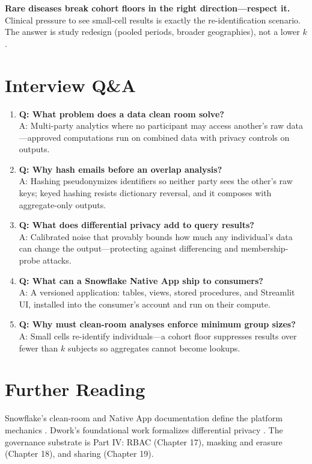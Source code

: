 \begin{pitfall}
\textbf{Rare diseases break cohort floors in the right direction---respect it.} Clinical pressure to see small-cell results is exactly the re-identification scenario. The answer is study redesign (pooled periods, broader geographies), not a lower $k$.
\end{pitfall}

\section{Interview Q\&A}
\begin{enumerate}
    \item \textbf{Q: What problem does a data clean room solve?}\\
    A: Multi-party analytics where no participant may access another's raw data---approved computations run on combined data with privacy controls on outputs.
    \item \textbf{Q: Why hash emails before an overlap analysis?}\\
    A: Hashing pseudonymizes identifiers so neither party sees the other's raw keys; keyed hashing resists dictionary reversal, and it composes with aggregate-only outputs.
    \item \textbf{Q: What does differential privacy add to query results?}\\
    A: Calibrated noise that provably bounds how much any individual's data can change the output---protecting against differencing and membership-probe attacks.
    \item \textbf{Q: What can a Snowflake Native App ship to consumers?}\\
    A: A versioned application: tables, views, stored procedures, and Streamlit UI, installed into the consumer's account and run on their compute.
    \item \textbf{Q: Why must clean-room analyses enforce minimum group sizes?}\\
    A: Small cells re-identify individuals---a cohort floor suppresses results over fewer than $k$ subjects so aggregates cannot become lookups.
\end{enumerate}

\section{Further Reading}
Snowflake's clean-room and Native App documentation define the platform mechanics \cite{snowflakeCleanRoomsDocs,snowflakeNativeAppsDocs}. Dwork's foundational work formalizes differential privacy \cite{dwork2006dp}. The governance substrate is Part IV: RBAC (Chapter 17), masking and erasure (Chapter 18), and sharing (Chapter 19).


